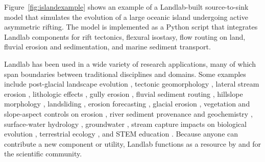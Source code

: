 \documentclass[10pt,twocolumn,preprint]{elsarticle}
\begin{document}
Figure~\ref{fig:islandexample} shows an example of a Landlab-built source-to-sink model that simulates the evolution of a large oceanic island undergoing active asymmetric rifting. The model is implemented as a Python script that integrates Landlab components for rift tectonics, flexural isostasy, flow routing on land, fluvial erosion and sedimentation, and marine sediment transport. 

Landlab has been used in a wide variety of research applications, many of which span boundaries between traditional disciplines and domains. Some examples include post-glacial landscape evolution \citep{lai2018modeled,barnhart2020inverting1,barnhart2020inverting2}, tectonic geomorphology \citep{gray2017off,reitman2019offset,zebari2019relative,lai2020tectonic,tucker2020modeling,pan2021numerical,shen2021modeling}, lateral stream erosion \citep{langston2018developing}, lithologic effects \citep{glade2019canyon,sheehan2020migrating}, gully erosion \citep{walker2020multi}, fluvial sediment routing \citep{pfeiffer2020networksedimenttransporter}, hillslope morphology \citep{tucker2018lattice}, landsliding \citep{strauch2018hydroclimatological}, erosion forecasting \citep{barnhart2020projections}, glacial erosion \citep{lai2020tectonic}, vegetation and slope-aspect controls on erosion \citep{pelletier2017way,schmid2018effect,carriere2020impact}, river sediment provenance and geochemistry \citep{sharman2019conversion,lipp2020river}, surface-water hydrology \citep{adams2017landlab,anand2020linear}, groundwater \citep{litwin2020groundwaterdupuitpercolator}, stream capture impacts on biological evolution \citep{lyons2020topographic,lyons2020speciesevolver}, terrestrial ecology \citep{evans2020beyond}, and STEM education \citep{bandaragoda2019enabling}. Because anyone can contribute a new component or utility, Landlab functions as a resource by and for the scientific community.
\end{document}

